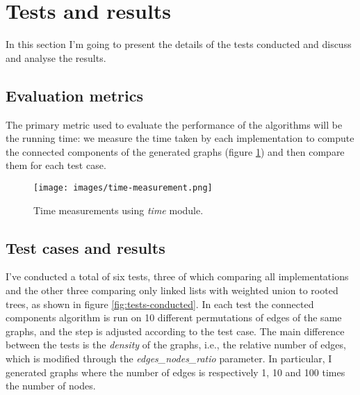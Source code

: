\documentclass[11pt]{article}
\begin{document}
    \section{Tests and results} \label{sec:tests-and-results}
    In this section I'm going to present the details of the tests conducted and discuss and analyse the results.
    \subsection{Evaluation metrics}
    The primary metric used to evaluate the performance of the algorithms will be the running time: we measure the time taken by each implementation to compute the connected components of the generated graphs (figure \ref{fig:time-measurement}) and then compare them for each test case.

    \begin{figure}[H]
        \centering
        \texttt{[image: images/time-measurement.png]}
        \caption{Time measurements using \textit{time} module.}
        \label{fig:time-measurement}
    \end{figure}

    \subsection{Test cases and results}
    I've conducted a total of six tests, three of which comparing all implementations and the other three comparing only linked lists with weighted union to rooted trees, as shown in figure \ref{fig:tests-conducted}. In each test the connected components algorithm is run on 10 different permutations of edges of the same graphs, and the step is adjusted according to the test case. The main difference between the tests is the \textit{density} of the graphs, i.e., the relative number of edges, which is modified through the \textit{edges\_nodes\_ratio} parameter. In particular, I generated graphs where the number of edges is respectively 1, 10 and 100 times the number of nodes.
\end{document}
